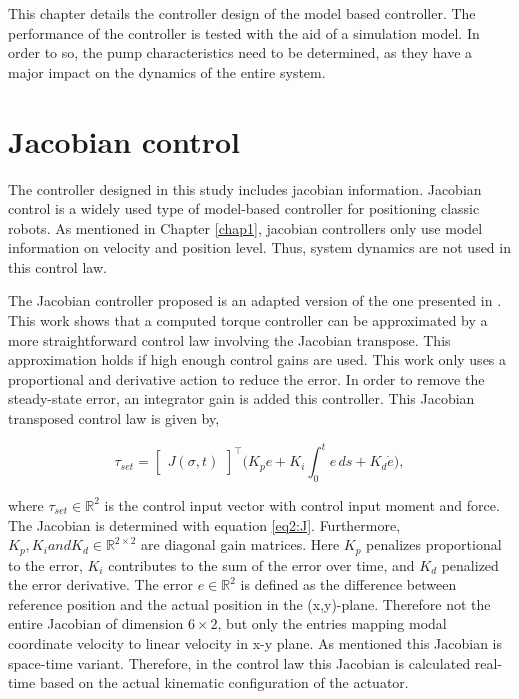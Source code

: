 This chapter details the controller design of the model based controller. The performance of the controller is tested with the aid of a simulation model. In order to so, the pump characteristics need to be determined, as they have a major impact on the dynamics of the entire system. 


\section{Jacobian control}


The controller designed in this study includes jacobian information. Jacobian control is a widely used type of model-based controller for positioning classic robots. As mentioned in Chapter \ref{chap1}, jacobian controllers only use model information on velocity and position level. Thus, system dynamics are not used in this control law.


The Jacobian controller proposed is an adapted version of the one presented in \cite{MOOSAVIAN20071226}. This work shows that a computed torque controller can be approximated by a more straightforward control law involving the Jacobian transpose. This approximation holds if high enough control gains are used. This work only uses a proportional and derivative action to reduce the error. In order to remove the steady-state error, an integrator gain is added this controller. This Jacobian transposed control law is given by,


\begin{equation}
    \tau_{set} = \begin{bmatrix}J(\sigma,t)\end{bmatrix}^\top \Big(K_p e + K_i \int_0^t e \hspace{2pt} ds +  K_d \dot{e}\Big), 
    \label{eq:tau}
\end{equation}

where $\tau_{set} \in \mathbb{R}^2$ is the control input vector with control input moment and force. The Jacobian is determined with equation \ref{eq2:J}. Furthermore, $K_p,K_i and K_d \in \mathbb{R}^{2\times 2}$ are diagonal gain matrices. Here $K_p$ penalizes proportional to the error, $K_i$ contributes to the sum of the error over time, and $K_d$ penalized the error derivative. The error $e \in \mathbb{R}^2$ is defined as the difference between reference position and the actual position in the (x,y)-plane. Therefore not the entire Jacobian of dimension $6 \times 2$, but only the entries mapping modal coordinate velocity to linear velocity in x-y plane. As mentioned this Jacobian is space-time variant. Therefore, in the control law this Jacobian is calculated real-time based on the actual kinematic configuration of the actuator. 

